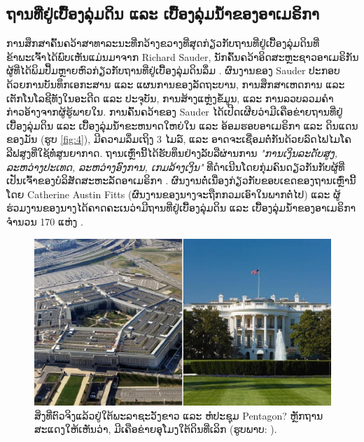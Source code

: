 \documentclass[10pt,twocolumn,letterpaper]{article}
\begin{document}
\subsection{ຖານທີ່ຢູ່ເບື້ອງລຸ່ມດິນ ແລະ ເບື້ອງລຸ່ມນ້ຳຂອງອາເມຣິກາ}

ການສຶກສາຄົ້ນຄວ້າສາທາລະນະທີ່ກວ້າງຂວາງທີ່ສຸດກ່ຽວກັບຖານທີ່ຢູ່ເບື້ອງລຸ່ມດິນທີ່ຂ້າພະເຈົ້າໄດ້ພົບເຫັນແມ່ນມາຈາກ Richard Sauder, ນັກຄົ້ນຄວ້າອິດສະຫຼະຊາວອາເມຣິກັນຜູ້ທີ່ໄດ້ພິມປຶ້ມຫຼາຍຫົວກ່ຽວກັບຖານທີ່ຢູ່ເບື້ອງລຸ່ມດິນລຶ່ມ \cite{22}. ຜົນງານຂອງ Sauder ປະກອບດ້ວຍການບັນທຶກເອກະສານ ແລະ ແຜນການຂອງລັດຖະບານ, ການສຶກສາເຫດການ ແລະ ເຕັກໂນໂລຊີທັງໃນອະດີດ ແລະ ປະຈຸບັນ, ການສ້າງແຫຼ່ງຂໍ້ມູນ, ແລະ ການລວບລວມຄຳກ່າວອ້າງຈາກຜູ້ຮູ້ພາຍໃນ. ການຄົ້ນຄວ້າຂອງ Sauder ໄດ້ເປີດເຜີຍວ່າມີເຄືອຂ່າຍຖານທີ່ຢູ່ເບື້ອງລຸ່ມດິນ ແລະ ເບື້ອງລຸ່ມນ້ຳຂະຫນາດໃຫຍ່ໃນ ແລະ ອ້ອມຮອບອາເມຣິກາ ແລະ ດິນແດນຂອງມັນ (ຮູບ \ref{fig:4}), ມີຄວາມລຶ່ມເຖິງ 3 ໄມລ໌, ແລະ ອາດຈະເຊື່ອມຕໍ່ກັນດ້ວຍລົດໄຟໄມໂຄລີຟສູງທີ່ໃຊ້ທໍ່ສູນຍາກາດ. ຖານເຫຼົ່ານີ້ໄດ້ຮັບທຶນຢ່າງລັບລືຜ່ານການ \textit{"ການເງິນລະດັບສູງ, ລະຫວ່າງປະເທດ, ລະຫວ່າງອົງການ, ເກມລ້າງເງິນ"} ທີ່ດຳເນີນໂດຍກຸ່ມຄົນດຽວກັນກັບຜູ້ທີ່ເປັນເຈົ້າຂອງບໍລິສັດສະຫະລັດອາເມຣິກາ \cite{22}. ຜົນງານຕໍ່ເນື່ອງກ່ຽວກັບຂອບເຂດຂອງຖານເຫຼົ່ານີ້ໂດຍ Catherine Austin Fitts (ຜົນງານຂອງນາງຈະຖືກກວມເອົາໃນພາກຕໍ່ໄປ) ແລະ ຜູ້ຮ່ວມງານຂອງນາງໄດ້ຄາດຄະເນວ່າມີຖານທີ່ຢູ່ເບື້ອງລຸ່ມດິນ ແລະ ເບື້ອງລຸ່ມນ້ຳຂອງອາເມຣິກາຈຳນວນ 170 ແຫ່ງ \cite{16,20}.

\begin{figure}[b]
\begin{center}
   \includegraphics[width=1\linewidth]{penta.jpg}
\end{center}
   \caption{ສິ່ງທີ່ຕົວຈິງແລ້ວຢູ່ໃຕ້ພະລາຊະວັງຂາວ ແລະ ຫໍປະຊຸມ Pentagon? ຫຼັກຖານສະແດງໃຫ້ເຫັນວ່າ, ມີເຄືອຂ່າຍອຸໂມງໃຕ້ດິນທີ່ເລິກ (ຮູບພາບ: \cite{31}).}
\label{fig:3}
\label{fig:onecol}
\end{figure}
\end{document}
